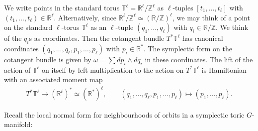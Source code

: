 \documentclass[10pt,a4paper]{amsart}
\numberwithin{equation}{section}
\begin{document}
We write points in the standard torus ${\mathbb T}^\ell = {\mathbb R}^\ell/{\mathbb Z}^\ell$ as
$\ell$-tuples $[t_1, \ldots, t_\ell]$
with $(t_1, \ldots, t_\ell) \in {\mathbb R}^\ell$.
Alternatively, since ${\mathbb R}^\ell/{\mathbb Z}^\ell \simeq ({\mathbb R}/{\mathbb Z})^\ell$,
we may think of
a point on the standard $\ell$-torus ${\mathbb T}^\ell $ as an $\ell$-tuple
$(q_1,\ldots, q_\ell)$ with $q_i \in {\mathbb R}/{\mathbb Z}$.  We think of the $q_i$s as
coordinates.  Then the cotangent bundle $T^*{\mathbb T}^\ell$ has canonical
coordinates $(q_1, \ldots, q_\ell, p_1,\ldots, p_\ell)$
with $p_i\in {\mathbb R}^*$.
The symplectic form on the cotangent bundle is given by
$\omega = \sum dp_i \wedge dq_i$ in these coordinates.
The lift of the action of ${\mathbb T}^\ell$ on itself by left multiplication
to the action on
$T^*{\mathbb T}^\ell$ is Hamiltonian with an associated moment map
\begin{gather*}
T^*{\mathbb T}^\ell \to ({\mathbb R}^\ell)^* \simeq ({\mathbb R}^*)^\ell, \qquad
(q_1,\ldots, q_\ell, p_1,\ldots, p_\ell)\mapsto (p_1,\ldots,  p_\ell).
\end{gather*}


Recall the local normal form for neighbourhoods of orbits
in a symplectic toric $G$-manifold:
\end{document}
